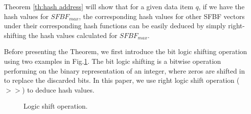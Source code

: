 \documentclass[10pt,journal,letterpaper]{IEEEtran}
\begin{document}
Theorem \ref{th:hash address} will show that for a given data item $q$, if we have the hash values for $SFBF_{max}$,
 the corresponding hash values for other SFBF vectors under their corresponding hash functions can be easily deduced by simply right-shifting the hash values calculated for $SFBF_{max}$.

Before presenting the Theorem, we first introduce the bit logic shifting operation using two examples in Fig.\ref{fig:Logic shift operation}. The bit logic shifting is a bitwise operation performing on the binary representation of an integer, where zeros are shifted in to replace the discarded bits. In this paper, we use right logic shift operation ($>>$) to deduce hash values.


\begin{figure}[!h]
\centering
{}
\caption{Logic shift operation.}
\label{fig:Logic shift operation}
\end{figure}
\end{document}
